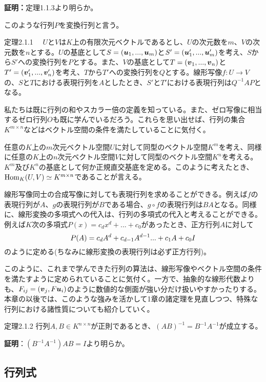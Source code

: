 \documentclass[dvipdfmx, 9pt, a4paper]{jsarticle}
\numberwithin{equation}{subsection}
\newcommand{\bm}[1]{{\mbox{\boldmath $#1$}}}
\begin{document}
{\bf 証明：}定理1.1.3より明らか。\par
このような行列$P$を変換行列と言う。
\begin{itembox}[l]{定理2.1.1}
　$U$と$V$は$K$上の有限次元ベクトルであるとし、$U$の次元数を$m$、$V$の次元数を$n$とする。$U$の基底として$S=(\bm u_1, ..., \bm u_m)$と$S'=(\bm u'_1, ..., \bm u'_m)$を考え、$S$から$S'$への変換行列を$P$とする。また、$V$の基底として$T=(\bm v_1, ..., \bm v_n)$と$T'=(\bm v'_1, ..., \bm v'_n)$を考え、$T$から$T'$への変換行列を$Q$とする。線形写像$f:U \to V$の、$S$と$T$における表現行列を$A$としたとき、$S'$と$T'$における表現行列は$Q^{-1}AP$となる。
\end{itembox}\par
私たちは既に行列の和やスカラー倍の定義を知っている。また、ゼロ写像に相当するゼロ行列$O$も既に学んでいるだろう。これらを思い出せば、行列の集合$K^{m \times n}$などはベクトル空間の条件を満たしていることに気付く。\par
任意の$K$上の$m$次元ベクトル空間$U$に対して同型のベクトル空間$K^m$を考え、同様に任意の$K$上の$n$次元ベクトル空間$V$に対して同型のベクトル空間$K^n$を考える。$K^m$及び$K^n$の基底として何か正規直交基底を定める。このように考えたとき、${\rm Hom}_K(U, V) \simeq K^{m \times n}$であることが言える。\par
線形写像同士の合成写像に対しても表現行列を求めることができる。例えば$f$の表現行列が$A$、$g$の表現行列が$B$である場合、$g \circ f$の表現行列は$BA$となる。同様に、線形変換の多項式への代入は、行列の多項式の代入と考えることができる。例えば$K$次の多項式$P(x)=c_dx^d+...+c_0$があったとき、正方行列$A$に対して
\begin{equation}
P(A)=c_dA^d+c_{d-1}A^{d-1}...+c_1A+c_0I \notag
\end{equation}
のように定める(ちなみに線形変換の表現行列は必ず正方行列)。\par
このように、これまで学んできた行列の算法は、線形写像やベクトル空間の条件を満たすように定められていることに気付く。一方で、抽象的な線形代数よりも、$F_{ij}=(\bm v_j, F\bm u_i)$のように数値的な側面が強い分だけ扱いやすかったりする。本章の以後では、このような強みを活かして1章の諸定理を見直しつつ、特殊な行列における諸性質についても紹介していく。
\begin{itembox}[l]{定理2.1.2}
行列$A, B \in K^{n \times n}$が正則であるとき、$(AB)^{-1}=B^{-1}A^{-1}$が成立する。
\end{itembox}
{\bf 証明}：$(B^{-1}A^{-1})AB=I$より明らか。


\subsection{行列式}
\end{document}
